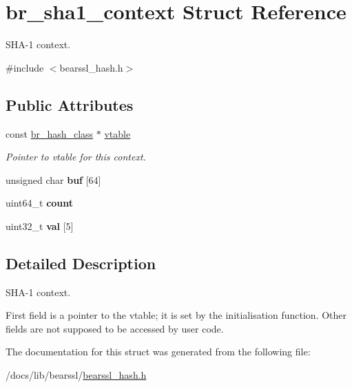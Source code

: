 \hypertarget{structbr__sha1__context}{}\section{br\+\_\+sha1\+\_\+context Struct Reference}
\label{structbr__sha1__context}


S\+H\+A-\/1 context.  




{\ttfamily \#include $<$bearssl\+\_\+hash.\+h$>$}

\subsection*{Public Attributes}
\begin{DoxyCompactItemize}
\item 
\mbox{\label{structbr__sha1__context_a3b38baab67ad976fe45b6c3d4523acab}} 
const \hyperlink{bearssl__hash_8h_ae38c1b9d539537cc16fc84388b922d86}{br\+\_\+hash\+\_\+class} $\ast$ \hyperlink{structbr__sha1__context_a3b38baab67ad976fe45b6c3d4523acab}{vtable}
\begin{DoxyCompactList}\small\item\em Pointer to vtable for this context. \end{DoxyCompactList}\item 
\mbox{\label{structbr__sha1__context_a0eb4c3b2a72d72e65b40de604bf86b16}} 
unsigned char {\bfseries buf} \mbox{[}64\mbox{]}
\item 
\mbox{\label{structbr__sha1__context_af3e2de76707f4a08450f4577042b5084}} 
uint64\+\_\+t {\bfseries count}
\item 
\mbox{\label{structbr__sha1__context_aa05a75c4fcca3e3af892f460174c9ce8}} 
uint32\+\_\+t {\bfseries val} \mbox{[}5\mbox{]}
\end{DoxyCompactItemize}


\subsection{Detailed Description}
S\+H\+A-\/1 context. 

First field is a pointer to the vtable; it is set by the initialisation function. Other fields are not supposed to be accessed by user code. 

The documentation for this struct was generated from the following file\+:\begin{DoxyCompactItemize}
\item 
/docs/lib/bearssl/\hyperlink{bearssl__hash_8h}{bearssl\+\_\+hash.\+h}\end{DoxyCompactItemize}
